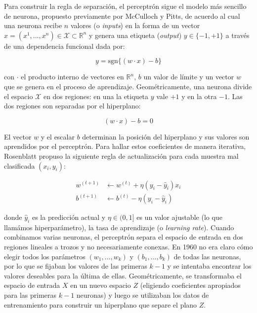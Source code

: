 \documentclass{report}
\begin{document}
Para construir la regla de separación, el perceptrón sigue el modelo más sencillo de neurona, propuesto previamente por McCulloch y Pitts, de acuerdo al cual una neurona recibe \(n\) valores (o \textit{inputs}) en la forma de un vector \(x = (x^1,\dots, x^n) \in \mathcal{X} \subset \mathbb{R}^n \) y genera una etiqueta (\textit{output}) \(y\in\{-1,+1\}\) a través de una dependencia funcional dada por:

\begin{equation}
    y = \text{sgn}\{(w \cdot x) - b\}
\end{equation}

con \(\cdot\) el producto interno de vectores en \(\mathbb{R}^n\), \(b\) un valor de límite y un vector \(w\) que se genera en el proceso de aprendizaje. Geométricamente, una neurona divide el espacio \(\mathcal{X}\) en dos regiones: en una la etiqueta \(y\) vale \(+1\) y en la otra \(-1\). Las dos regiones son separadas por el hiperplano:

\begin{equation}
    (w \cdot x) - b = 0
\end{equation}

El vector \(w\) y el escalar \(b\) determinan la posición del hiperplano y sus valores son aprendidos por el perceptrón. Para hallar estos coeficientes de manera iterativa, Rosenblatt propuso la siguiente regla de actualización para cada muestra mal clasificada $(x_i, y_i)$:

\begin{align}
    w^{(t+1)} &\gets w^{(t)} + \eta (y_i - \hat{y}_i) x_i \\
    b^{(t+1)} &\gets b^{(t)} - \eta (y_i - \hat{y}_i)
\end{align}

donde $\hat{y}_i$ es la predicción actual y $\eta \in (0, 1]$ es un valor ajustable (lo que llamámos hiperparámetro), la tasa de aprendizaje (o \textit{learning rate}).
Cuando combinamos varias neuronas, el perceptrón separa el espacio de entrada en dos regiones lineales a trozos y no necesariamente conexas.
En 1960 no era claro cómo elegir todos los parámetros \((w_1,\dots,w_k)\) y \((b_1,\dots, b_k)\) de todas las neuronas, por lo que se fijaban los valores de las
primeras \(k-1\) y se intentaba encontrar los valores deseables para la última de ellas. Geométricamente, se transformaba el espacio de entrada $X$ en un nuevo espacio $Z$
(eligiendo coeficientes apropiados para las primeras $k-1$ neuronas) y luego se utilizaban los datos de entrenamiento para construir un hiperplano que separe el plano $Z$.
\end{document}
